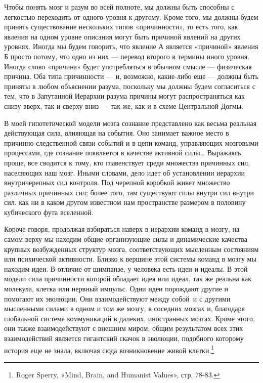 Чтобы понять мозг и разум во всей полноте, мы должны быть способны с легкостью переходить от одного уровня к другому. Кроме того, мы должны будем принять существование нескольких типов «причинности», то есть того, как явления на одном уровне описания могут быть причиной явлений на других уровнях. Иногда мы будем говорить, что явление А является «причиной» явления Б просто потому, что одно из них --- перевод второго в термины иного уровня. Иногда слово «причина» будет употребляться в обычном смысле --- физическая причина. Оба типа причинности --- и, возможно, какие-либо еще --- должны быть приняты в любом объяснении разума, поскольку мы должны будем согласиться с тем, что в Запутанной Иерархии разума причины могут распространяться как снизу вверх, так и сверху вниз --- так же, как и в схеме Центральной Догмы.

В моей гипотетической модели мозга сознание представлено как весьма реальная действующая сила, влияющая на события. Оно занимает важное место в причинно-следственной связи событий и в цепи команд, управляющих мозговыми процессами, где сознание появляется в качестве активной силы\ldots{} Выражаясь проще, все сводится к тому, кто главенствует среди множества причинных сил, населяющих наш мозг. Иными словами, дело идет об установлении иерархии внутричерепных сил контроля. Под черепной коробкой живет множество различных причинных сил; более того, там существуют силы внутри сил внутри сил. как ни в каком другом известном нам пространстве размером в половину кубического фута вселенной.

Короче говоря, продолжая взбираться наверх в иерархии команд в мозгу, на самом верху мы находим общие организующие силы и динамические качества крупных возбужденных структур мозга, соответствующих мысленным состояниям или психической активности. Близко к вершине этой системы команд в мозгу мы находим идеи. В отличие от шимпанзе, у человека есть идеи и идеалы. В этой модели сила причинности которой обладает идея или идеал, так же реальна как молекула, клетка или нервный импульс. Одни идеи порождают другие и помогают их эволюции. Они взаимодействуют между собой~и с другими мысленными силами в одном и том же мозгу, в соседних мозгах и, благодаря глобальной системе коммуникаций в далеких, иностранных мозгах. Кроме этого, они также взаимодействуют с внешним миром; общим результатом всех этих взаимодействий является гигантский скачок в эволюции, подобного которому история еще не знала, включая сюда возникновение живой клетки.\footnote{Roger Sperry, «Mind, Brain, and Humanist Values», стр. 78-83.}

